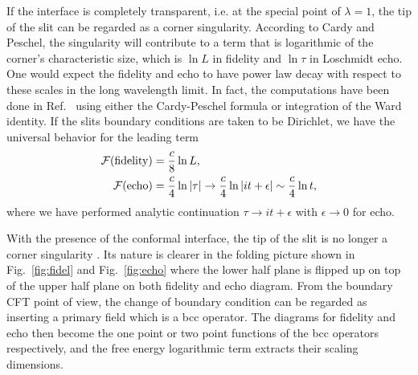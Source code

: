 If the interface is completely transparent, i.e. at the special point of $\lambda = 1$, the tip of the slit can be regarded as a corner singularity. According to Cardy and Peschel\cite{cardy_finite-size_1988}, the singularity will contribute to a term that is logarithmic of the corner's characteristic size, which is $\ln L$ in fidelity and $\ln \tau$ in Loschmidt echo. One would expect the fidelity and echo to have power law decay with respect to these scales in the long wavelength limit. In fact, the computations have been done in Ref.~ using either the Cardy-Peschel formula or integration of the Ward identity. If the slits boundary conditions are taken to be Dirichlet, we have the universal behavior for the leading term \cite{stephan_logarithmic_2013,stephan_local_2011}
\begin{equation}
\label{eq:full-pass}
\begin{aligned}
  \mathcal{F}({\rm fidelity}) &=  \frac{c}{8} \ln L, \\
 \mathcal{F}( {\rm echo} )  &= \frac{c}{4} \ln |\tau| \rightarrow \frac{c}{4} \ln |it + \epsilon|   \sim \frac{c}{4}\ln t ,
\end{aligned}
\end{equation}
where we have performed analytic continuation $\tau \rightarrow it + \epsilon$ with $\epsilon \rightarrow 0$ for echo.

With the presence of the conformal interface, the tip of the slit is no longer a corner singularity\cite{cardy_finite-size_1988} . Its nature is clearer in the folding picture shown in Fig.~\ref{fig:fidel} and Fig.~\ref{fig:echo} where the lower half plane is flipped up on top of the upper half plane on both fidelity and echo diagram. From the boundary CFT point of view, the change of boundary condition can be regarded as inserting a primary field which is a bcc operator. The diagrams for fidelity and echo then become the one point or two point functions of the bcc operators respectively, and the free energy logarithmic term extracts their scaling dimensions. 


